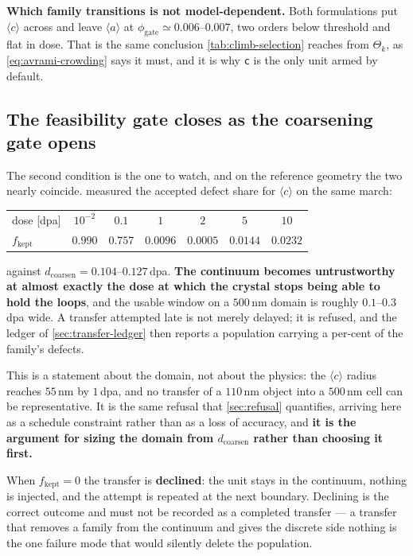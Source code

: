 \documentclass{article}
\newcommand{\aloop}{\ensuremath{\langle a\rangle}}
\newcommand{\cloop}{\ensuremath{\langle c\rangle}}
\begin{document}
\textbf{Which family transitions is not model-dependent.} Both formulations put
\cloop{} across and leave \aloop{} at $\phi_{\mathrm{gate}}\simeq0.006$--$0.007$,
two orders below threshold and flat in dose. That is the same conclusion
\cref{tab:climb-selection} reaches from $\Theta_k$, as \cref{eq:avrami-crowding}
says it must, and it is why \texttt{c} is the only unit armed by default.

\subsection{The feasibility gate closes as the coarsening gate opens}
\label{sec:trigger-window}

The second condition is the one to watch, and on the reference geometry the two
nearly coincide.  measured the accepted defect share for
\cloop{} on the same march:
\begin{center}\small
\begin{tabular}{@{}lcccccc@{}}
\toprule
dose [dpa] & $10^{-2}$ & $0.1$ & $1$ & $2$ & $5$ & $10$\\
$f_{\mathrm{kept}}$ & $0.990$ & $0.757$ & $0.0096$ & $0.0005$ & $0.0144$ & $0.0232$\\
\bottomrule
\end{tabular}
\end{center}
against $d_{\mathrm{coarsen}}=0.104$--$0.127\,$dpa. \textbf{The continuum becomes
untrustworthy at almost exactly the dose at which the crystal stops being able to
hold the loops}, and the usable window on a $500\,$nm domain is roughly
$0.1$--$0.3\,$dpa wide. A transfer attempted late is not merely delayed; it is
refused, and the ledger of \cref{sec:transfer-ledger} then reports a population
carrying a per-cent of the family's defects.

This is a statement about the domain, not about the physics: the \cloop{} radius
reaches $55\,$nm by $1\,$dpa, and no transfer of a $110\,$nm object into a
$500\,$nm cell can be representative. It is the same refusal that
\cref{sec:refusal} quantifies, arriving here as a schedule constraint rather than
as a loss of accuracy, and \textbf{it is the argument for sizing the domain from
$d_{\mathrm{coarsen}}$ rather than choosing it first.}

When $f_{\mathrm{kept}}=0$ the transfer is \textbf{declined}: the unit stays in
the continuum, nothing is injected, and the attempt is repeated at the next
boundary. Declining is the correct outcome and must not be recorded as a
completed transfer --- a transfer that removes a family from the continuum and
gives the discrete side nothing is the one failure mode that would silently
delete the population.
\end{document}
